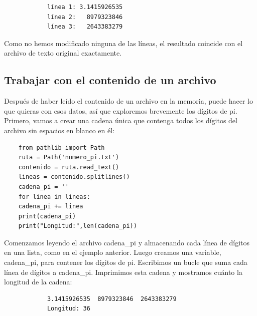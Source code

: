{\ttfamily\scriptsize\scriptsize 
	\hspace{-0.65cm} \vspace{-0.3cm}	
	{\color{blue} 	
		\begin{verbatim}
			línea 1: 3.1415926535
			línea 2:   8979323846
			línea 3:   2643383279
		\end{verbatim}
}}  

Como no hemos modificado ninguna de las líneas, el resultado coincide con el
archivo de texto original exactamente.

\subsection{Trabajar con el contenido de un archivo}

Después de haber leído el contenido de un archivo en la memoria, puede hacer lo que quieras con esos datos, 
así que exploremos brevemente los dígitos de pi. Primero, vamos a crear una cadena única  que contenga todos los dígitos del archivo sin espacios en blanco en él:

\hspace{-2.0cm}{\ttfamily \scriptsize cadena}

\vspace{-0.2cm}
\hspace{-1.7cm}{\ttfamily \scriptsize \_pi.py}\vspace{-0.84cm}
\begin{lstlisting}
	from pathlib import Path
	ruta = Path('numero_pi.txt')
	contenido = ruta.read_text()
	lineas = contenido.splitlines()	
	cadena_pi = ''
	for linea in lineas:
	cadena_pi += linea
	print(cadena_pi)
	print("Longitud:",len(cadena_pi))
\end{lstlisting}

Comenzamos leyendo el archivo {\ttfamily cadena\_pi} y almacenando cada línea de dígitos en una lista, como en el ejemplo anterior. Luego creamos una variable, {\ttfamily cadena\_pi}, para contener los dígitos de pi. Escribimos un bucle que suma cada línea de dígitos a {\ttfamily cadena\_pi}. Imprimimos esta cadena y mostramos cuánto la longitud de la cadena:

{\ttfamily\scriptsize\scriptsize 
	\hspace{-0.65cm} \vspace{-0.3cm}	
	{\color{blue} 	
		\begin{verbatim}
			3.1415926535  8979323846  2643383279
			Longitud: 36			
		\end{verbatim}
}}

